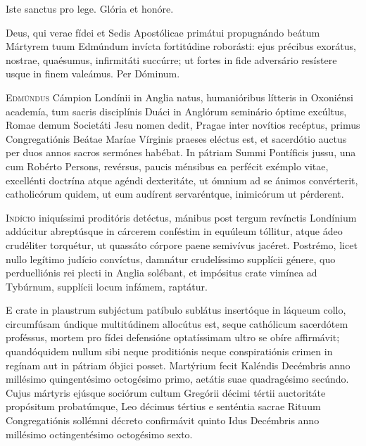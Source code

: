\begin{caputFesti}
  \dioecPraga
\end{caputFesti}

Iste sanctus pro lege.
Glória et honóre.

\parsOratio
Deus, qui verae fídei
et Sedis Apostólicae primátui propugnándo
beátum Mártyrem tuum Edmúndum
invícta fortitúdine roborásti:
ejus précibus exorátus,
nostrae, quaésumus, infirmitáti succúrre;
ut fortes in fide adversário resístere usque in finem valeámus.
Per Dóminum.


\horaNocturnusII


\lettrine{E}{dmúndus} Cámpion Londínii in Anglia natus,
humanióribus lítteris in Oxoniénsi academía,
tum sacris disciplínis Duáci in Anglórum seminário óptime excúltus,
Romae demum Societáti Jesu nomen dedit,
Pragae inter novítios recéptus,
primus Congregatiónis Beátae Maríae Vírginis praeses eléctus est,
et sacerdótio auctus per duos annos sacros sermónes habébat.
In pátriam Summi Pontíficis jussu,
una cum Robérto Persons, revérsus,
paucis ménsibus ea perfécit exémplo vitae,
excellénti doctrína atque agéndi dexteritáte,
ut ómnium ad se ánimos convérterit,
catholicórum quidem, ut eum audírent servaréntque,
inimicórum ut pérderent.



\lettrine{I}{ndício} iniquíssimi proditóris detéctus,
mánibus post tergum revínctis Londínium addúcitur
abreptúsque in cárcerem conféstim in equúleum tóllitur,
atque ádeo crudéliter torquétur,
ut quassáto córpore paene semivívus jacéret.
Postrémo, licet nullo legítimo judício convíctus,
damnátur crudelíssimo supplícii génere,
quo perduelliónis rei plecti in Anglia solébant,
et impósitus crate vimínea ad Tybúrnum,
supplícii locum infámem, raptátur.


\lettrine{E}{} crate in plaustrum subjéctum patíbulo sublátus
insertóque in láqueum collo,
circumfúsam úndique multitúdinem allocútus est,
seque cathólicum sacerdótem proféssus,
mortem pro fídei defensióne optatíssimam ultro se obíre affirmávit;
quandóquidem nullum sibi neque proditiónis neque conspiratiónis
crimen in regínam aut in pátriam óbjici posset.
Martýrium fecit Kaléndis Decémbris
anno millésimo quingentésimo octogésimo primo,
aetátis suae quadragésimo secúndo.
Cujus mártyris ejúsque sociórum cultum Gregórii décimi tértii
auctoritáte propósitum probatúmque,
Leo décimus tértius e senténtia sacrae Rituum Congregatiónis
sollémni décreto confirmávit quinto Idus Decémbris
anno millésimo octingentésimo octogésimo sexto.

